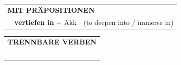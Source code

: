\documentclass[10pt,a4paper]{revtex4-2}
\begin{document}
\begin{verbbox-acc}
\vspace{10pt}

\begin{tabular}{lll}
\multicolumn{3}{l}{\textbf{MIT PRÄPOSITIONEN}}\\
& \textbf{vertiefen in} + Akk & (to deepen into / immerse in)\\
\end{tabular}
\hfill
\begin{tabular}{lll}
\multicolumn{3}{l}{\textbf{TRENNBARE VERBEN}}\\
& ---\\
\end{tabular}

\vspace{-5pt}
\end{verbbox-acc}

\end{document}
